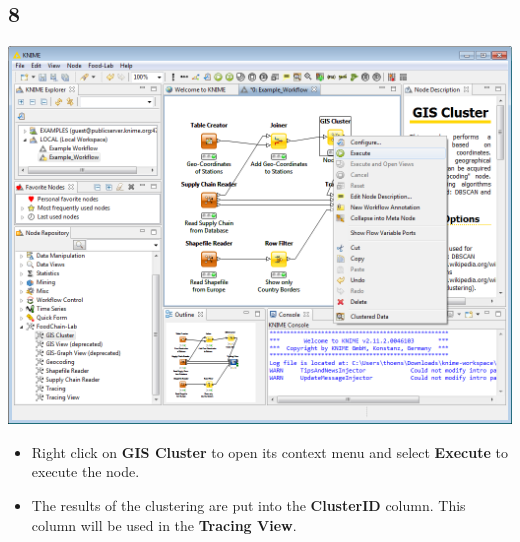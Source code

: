 \documentclass{beamer}
\begin{document}
\subsection{8}
\begin{frame}
	\begin{center}
  		\includegraphics[height=0.6\textheight]{8.png}
	\end{center}
	\begin{itemize}
		\item Right click on \textbf{GIS Cluster} to open its context menu and select \textbf{Execute} to execute the node.
		\item The results of the clustering are put into the \textbf{ClusterID} column. This column will be used in the \textbf{Tracing View}.
	\end{itemize}
\end{frame}
\end{document}
